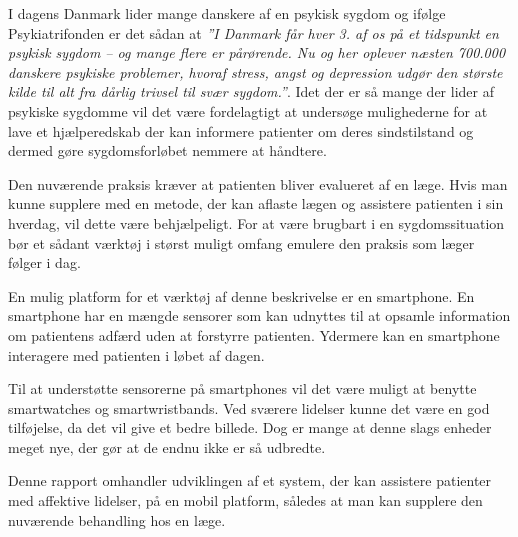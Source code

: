 


I dagens Danmark lider mange danskere af en psykisk sygdom og ifølge Psykiatrifonden er det sådan at \textit{''I Danmark får hver 3. af os på et tidspunkt en psykisk sygdom – og mange flere er pårørende. 
Nu og her oplever næsten 700.000 danskere psykiske problemer, hvoraf stress, angst og depression udgør den største kilde til alt fra dårlig trivsel til svær sygdom.''}\citep{psykiatrifonden}.
Idet der er så mange der lider af psykiske sygdomme vil det være fordelagtigt at undersøge mulighederne for at lave et hjælperedskab der kan informere patienter om deres sindstilstand og dermed gøre sygdomsforløbet nemmere at håndtere.

Den nuværende praksis kræver at patienten bliver evalueret af en læge.
Hvis man kunne supplere med en metode, der kan aflaste lægen og assistere patienten i sin hverdag, vil dette være behjælpeligt. 
For at være brugbart i en sygdomssituation bør et sådant værktøj i størst muligt omfang emulere den praksis som læger følger i dag.

En mulig platform for et værktøj af denne beskrivelse er en smartphone.
En smartphone har en mængde sensorer som kan udnyttes til at opsamle information om patientens adfærd uden at forstyrre patienten.
Ydermere kan en smartphone interagere med patienten i løbet af dagen. 

Til at understøtte sensorerne på smartphones vil det være muligt at benytte smartwatches og smartwristbands.
Ved sværere lidelser kunne det være en god tilføjelse, da det vil give et bedre billede.
Dog er mange at denne slags enheder meget nye, der gør at de endnu ikke er så udbredte.

Denne rapport omhandler udviklingen af et system, der kan assistere patienter med affektive lidelser, på en mobil platform, således at man kan supplere den nuværende behandling hos en læge.
